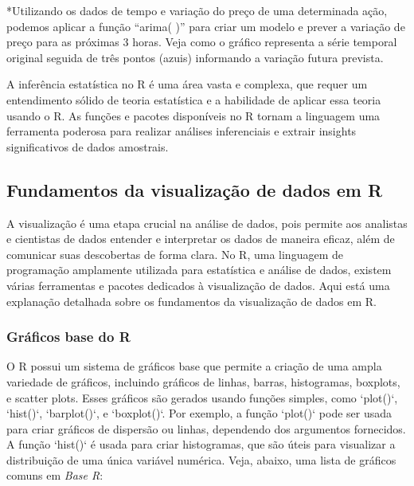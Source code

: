 \documentclass[
]{book}
\begin{document}
*Utilizando os dados de tempo e variação do preço de uma determinada ação, podemos aplicar a função ``arima( )'' para criar um modelo e prever a variação de preço para as próximas 3 horas. Veja como o gráfico representa a série temporal original seguida de três pontos (azuis) informando a variação futura prevista.

A inferência estatística no R é uma área vasta e complexa, que requer um entendimento sólido de teoria estatística e a habilidade de aplicar essa teoria usando o R. As funções e pacotes disponíveis no R tornam a linguagem uma ferramenta poderosa para realizar análises inferenciais e extrair insights significativos de dados amostrais.

\subsection{Fundamentos da visualização de dados em R}\label{fundamentos-da-visualizauxe7uxe3o-de-dados-em-r}

A visualização é uma etapa crucial na análise de dados, pois permite aos analistas e cientistas de dados entender e interpretar os dados de maneira eficaz, além de comunicar suas descobertas de forma clara. No R, uma linguagem de programação amplamente utilizada para estatística e análise de dados, existem várias ferramentas e pacotes dedicados à visualização de dados. Aqui está uma explanação detalhada sobre os fundamentos da visualização de dados em R.

\subsubsection{Gráficos base do R}\label{gruxe1ficos-base-do-r}

O R possui um sistema de gráficos base que permite a criação de uma ampla variedade de gráficos, incluindo gráficos de linhas, barras, histogramas, boxplots, e scatter plots. Esses gráficos são gerados usando funções simples, como `plot()`, `hist()`, `barplot()`, e `boxplot()`. Por exemplo, a função `plot()` pode ser usada para criar gráficos de dispersão ou linhas, dependendo dos argumentos fornecidos. A função `hist()` é usada para criar histogramas, que são úteis para visualizar a distribuição de uma única variável numérica. Veja, abaixo, uma lista de gráficos comuns em \emph{Base R}:
\end{document}
